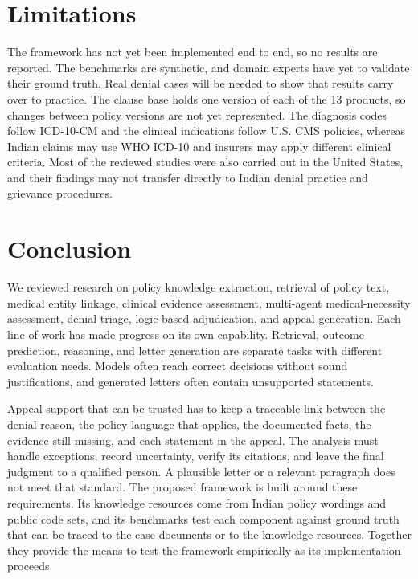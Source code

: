 \documentclass[conference]{IEEEtran}
\begin{document}
\section{Limitations}
\label{sec:limitations}
The framework has not yet been implemented end to end, so no results are reported. The benchmarks are synthetic, and domain experts have yet to validate their ground truth. Real denial cases will be needed to show that results carry over to practice. The clause base holds one version of each of the 13 products, so changes between policy versions are not yet represented. The diagnosis codes follow ICD-10-CM and the clinical indications follow U.S. CMS policies, whereas Indian claims may use WHO ICD-10 and insurers may apply different clinical criteria. Most of the reviewed studies were also carried out in the United States, and their findings may not transfer directly to Indian denial practice and grievance procedures.

\section{Conclusion}
\label{sec:conclusion}
We reviewed research on policy knowledge extraction, retrieval of policy text, medical entity linkage, clinical evidence assessment, multi-agent medical-necessity assessment, denial triage, logic-based adjudication, and appeal generation. Each line of work has made progress on its own capability. Retrieval, outcome prediction, reasoning, and letter generation are separate tasks with different evaluation needs. Models often reach correct decisions without sound justifications, and generated letters often contain unsupported statements.

Appeal support that can be trusted has to keep a traceable link between the denial reason, the policy language that applies, the documented facts, the evidence still missing, and each statement in the appeal. The analysis must handle exceptions, record uncertainty, verify its citations, and leave the final judgment to a qualified person. A plausible letter or a relevant paragraph does not meet that standard. The proposed framework is built around these requirements. Its knowledge resources come from Indian policy wordings and public code sets, and its benchmarks test each component against ground truth that can be traced to the case documents or to the knowledge resources. Together they provide the means to test the framework empirically as its implementation proceeds.
\end{document}
